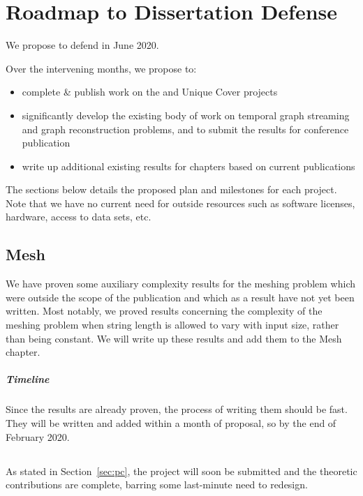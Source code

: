 \chapter{Roadmap to Dissertation Defense}
\label{chap:roadmap}

We propose to defend in June 2020.

Over the intervening months, we propose to:
\begin{itemize}
\item complete \& publish work on the \sysname{} and Unique Cover projects
\item significantly develop the existing body of work on temporal graph streaming and graph reconstruction problems, and to submit the results for conference publication
\item write up additional existing results for chapters based on current publications
\end{itemize}

The sections below details the proposed plan and milestones for each project.  Note that we have no current need for outside resources such as software licenses, hardware, access to data sets, etc.

\section{Mesh}
We have proven some auxiliary complexity results for the meshing problem which were outside the scope of the publication and which as a result have not yet been written.  Most notably, we proved results concerning the complexity of the meshing problem when string length is allowed to vary with input size, rather than being constant.  We will write up these results and add them to the Mesh chapter.

\paragraph*{Timeline}
Since the results are already proven, the process of writing them should be fast.  They will be written and added within a month of proposal, so by the end of February 2020.

\section{\sysname}
As stated in Section~\ref{sec:pc}, the \sysname{} project will soon be submitted and the theoretic contributions are complete, barring some last-minute need to redesign.  

